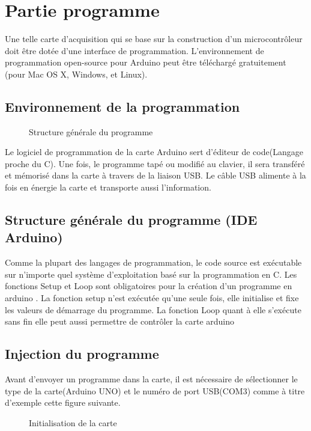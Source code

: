 \documentclass[12pt, openany]{report}
\begin{document}
         		
         		 \section{Partie programme}
         		
         		 Une telle carte d'acquisition qui se base sur la construction d'un microcontrôleur doit être dotée d'une interface de programmation. L'environnement de programmation open-source pour Arduino peut être téléchargé
         		 gratuitement (pour Mac OS X, Windows, et Linux).
         		 \subsection{ Environnement de la programmation}
         		   \begin{figure}[!h]
         		                    \centering
         		 
         		             \caption{Structure générale du programme}
         		                   		          		
         		      \end{figure}
         		 Le logiciel de programmation de la carte Arduino sert d'éditeur de code(Langage
         		 proche du C). Une fois, le programme tapé ou modifié au clavier, il sera transféré et
         		 mémorisé dans la carte à travers de la liaison USB. Le câble USB alimente à la fois en énergie la carte et transporte aussi l'information.
         		 \subsection{Structure générale du programme (IDE Arduino)}
         		 Comme la plupart des langages de programmation, le code source est exécutable sur n'importe quel système d'exploitation basé sur la programmation
         		 en C. Les fonctions Setup et Loop sont obligatoires pour la création d'un programme en arduino .
         		 La fonction setup n'est exécutée qu'une seule fois, elle initialise et fixe les valeurs de démarrage du programme. La fonction Loop quant à elle s'exécute sans fin elle peut aussi permettre de contrôler la carte arduino
 
              		       		
         		
         		 \subsection{Injection du programme}
         		 Avant d'envoyer un programme dans la carte, il est nécessaire de sélectionner le type de la carte(Arduino UNO) et le numéro de port USB(COM3) comme à titre d'exemple cette
         		 figure suivante.
  \begin{figure}[!h]
                \centering

         \caption{Initialisation de la carte }
               		          		
               		          		 \end{figure}
           		       		
\end{document}
